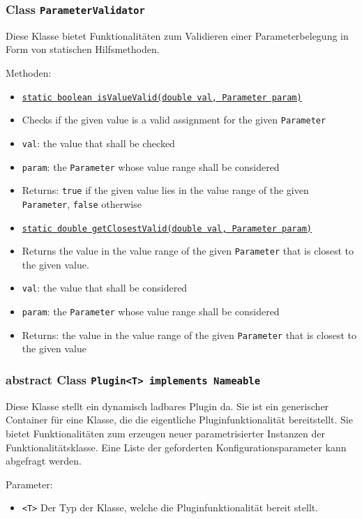 \documentclass[parskip=full,11pt]{scrartcl}
\begin{document}
\subsubsection{Class \texttt{ParameterValidator}}

Diese Klasse bietet Funktionalitäten zum Validieren einer Parameterbelegung in Form von statischen Hilfsmethoden.

Methoden:

\begin{itemize} \itemsep -10pt
	\item \underline{\texttt{static boolean isValueValid(double val, Parameter param)}}
	\item[] Checks if the given value is a valid assignment for the given \texttt{Parameter}
	\item[] \texttt{val}: the value that shall be checked
	\item[] \texttt{param}: the \texttt{Parameter} whose value range shall be considered
	\item[] Returns: \texttt{true} if the given value lies in the value range of the given \texttt{Parameter}, \texttt{false} otherwise
	\item \underline{\texttt{static double getClosestValid(double val, Parameter param)}}
	\item[] Returns the value in the value range of the given \texttt{Parameter} that is closest to the given value.
	\item[] \texttt{val}: the value that shall be considered
	\item[] \texttt{param}: the \texttt{Parameter} whose value range shall be considered
	\item[] Returns: the value in the value range of the given \texttt{Parameter} that is closest to the given value
\end{itemize}

\subsubsection{abstract Class \texttt{Plugin<T> implements  Nameable}}

Diese Klasse stellt ein dynamisch ladbares Plugin da. Sie ist ein generischer Container für eine Klasse, die die eigentliche Pluginfunktionalität bereitstellt. Sie bietet Funktionalitäten zum erzeugen neuer parametrisierter Instanzen der Funktionalitätsklasse. Eine Liste der geforderten Konfigurationsparameter kann abgefragt werden.

Parameter:
\begin{itemize}\itemsep -10pt
	\item \texttt{<T>} Der Typ der Klasse, welche die Pluginfunktionalität bereit stellt. 
\end{itemize}
\end{document}
